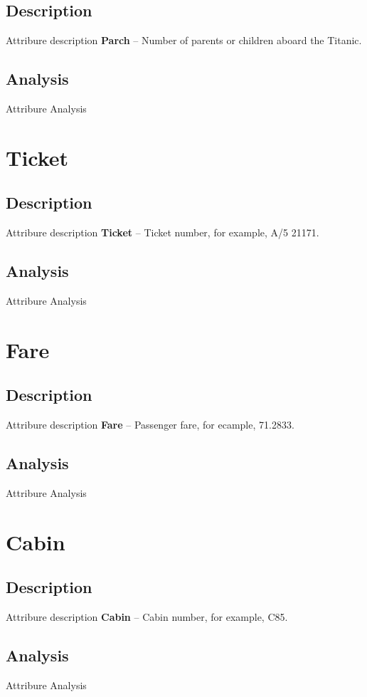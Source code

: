 \subsection{Description}
Attribure description
\textbf{Parch} -- Number of parents or children aboard the Titanic.

\subsection{Analysis}
Attribure Analysis


\section{Ticket} \label{section:Ticket}
\subsection{Description}
Attribure description
\textbf{Ticket} -- Ticket number, for example, A/5 21171.

\subsection{Analysis}
Attribure Analysis


\section{Fare} \label{section:Fare}
\subsection{Description}
Attribure description
\textbf{Fare} -- Passenger fare, for ecample, 71.2833.

\subsection{Analysis}
Attribure Analysis


\section{Cabin} \label{section:Cabin}
\subsection{Description}
Attribure description
\textbf{Cabin} -- Cabin number, for example, C85.

\subsection{Analysis}
Attribure Analysis


